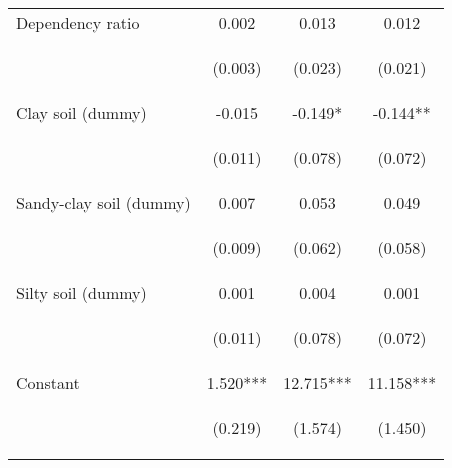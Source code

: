 \begin{center}
\begin{tabular}{lccc}
Dependency ratio & 0.002 & 0.013 & 0.012 \\
\vspace{4pt} & \begin{footnotesize}(0.003)\end{footnotesize} & \begin{footnotesize}(0.023)\end{footnotesize} & \begin{footnotesize}(0.021)\end{footnotesize} \\
Clay soil (dummy) & -0.015 & -0.149* & -0.144** \\
\vspace{4pt} & \begin{footnotesize}(0.011)\end{footnotesize} & \begin{footnotesize}(0.078)\end{footnotesize} & \begin{footnotesize}(0.072)\end{footnotesize} \\
Sandy-clay soil (dummy) & 0.007 & 0.053 & 0.049 \\
\vspace{4pt} & \begin{footnotesize}(0.009)\end{footnotesize} & \begin{footnotesize}(0.062)\end{footnotesize} & \begin{footnotesize}(0.058)\end{footnotesize} \\
Silty soil (dummy) & 0.001 & 0.004 & 0.001 \\
\vspace{4pt} & \begin{footnotesize}(0.011)\end{footnotesize} & \begin{footnotesize}(0.078)\end{footnotesize} & \begin{footnotesize}(0.072)\end{footnotesize} \\
Constant & 1.520*** & 12.715*** & 11.158*** \\
 & \begin{footnotesize}(0.219)\end{footnotesize} & \begin{footnotesize}(1.574)\end{footnotesize} & \begin{footnotesize}(1.450)\end{footnotesize} \\

\end{tabular}
\end{center}
